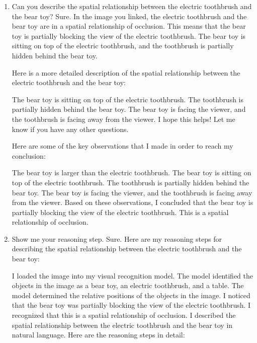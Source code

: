     \begin{enumerate}
        \item Can you describe the spatial relationship between the electric toothbrush and the bear toy?
        \subitem Sure. In the image you linked, the electric toothbrush and the bear toy are in a spatial relationship of occlusion. This means that the bear toy is partially blocking the view of the electric toothbrush. The bear toy is sitting on top of the electric toothbrush, and the toothbrush is partially hidden behind the bear toy.

        Here is a more detailed description of the spatial relationship between the electric toothbrush and the bear toy:
        
        The bear toy is sitting on top of the electric toothbrush.
        The toothbrush is partially hidden behind the bear toy.
        The bear toy is facing the viewer, and the toothbrush is facing away from the viewer.
        I hope this helps! Let me know if you have any other questions.
        
        Here are some of the key observations that I made in order to reach my conclusion:
        
        The bear toy is larger than the electric toothbrush.
        The bear toy is sitting on top of the electric toothbrush.
        The toothbrush is partially hidden behind the bear toy.
        The bear toy is facing the viewer, and the toothbrush is facing away from the viewer.
        Based on these observations, I concluded that the bear toy is partially blocking the view of the electric toothbrush. This is a spatial relationship of occlusion.
        \item Show me your reasoning step.
        \subitem Sure. Here are my reasoning steps for describing the spatial relationship between the electric toothbrush and the bear toy:

        I loaded the image into my visual recognition model.
        The model identified the objects in the image as a bear toy, an electric toothbrush, and a table.
        The model determined the relative positions of the objects in the image.
        I noticed that the bear toy was partially blocking the view of the electric toothbrush.
        I recognized that this is a spatial relationship of occlusion.
        I described the spatial relationship between the electric toothbrush and the bear toy in natural language.
        Here are the reasoning steps in detail:
        

\end{enumerate}
